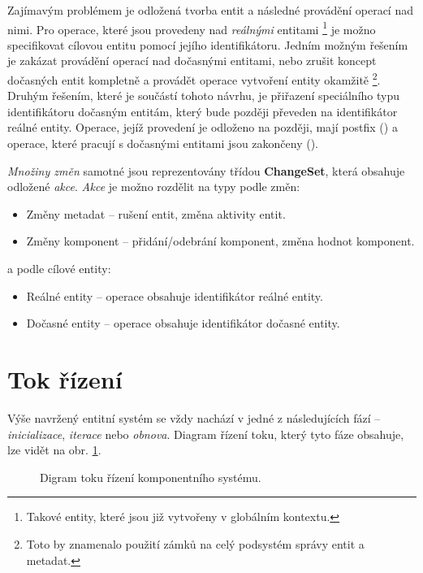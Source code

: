 Zajímavým problémem je odložená tvorba entit a následné provádění operací nad nimi. Pro operace, které jsou provedeny nad \emph{reálnými} entitami \footnote{Takové entity, které jsou již vytvořeny v globálním kontextu.} je možno specifikovat cílovou entitu pomocí jejího identifikátoru. Jedním možným řešením je zakázat provádění operací nad dočasnými entitami, nebo zrušit koncept dočasných entit kompletně a provádět operace vytvoření entity okamžitě \footnote{Toto by znamenalo použití zámků na celý podsystém správy entit a metadat.}. Druhým řešením, které je součástí tohoto návrhu, je přiřazení speciálního typu identifikátoru dočasným entitám, který bude později převeden na identifikátor reálné entity. Operace, jejíž provedení je odloženo na později, mají postfix  () a operace, které pracují s dočasnými entitami jsou zakončeny  ().

\emph{Množiny změn} samotné jsou reprezentovány třídou \textbf{ChangeSet}, která obsahuje odložené \emph{akce}. \emph{Akce} je možno rozdělit na typy podle změn:
\begin{itemize}
	\item Změny metadat -- rušení entit, změna aktivity entit.
	\item Změny komponent -- přidání/odebrání komponent, změna hodnot komponent.
\end{itemize}
\noindent a podle cílové entity: 
\begin{itemize}
	\item Reálné entity -- operace obsahuje identifikátor reálné entity.
	\item Dočasné entity -- operace obsahuje identifikátor dočasné entity.
\end{itemize}

\section{Tok řízení}

Výše navržený entitní systém se vždy nachází v jedné z následujících fází -- \emph{inicializace}, \emph{iterace} nebo \emph{obnova}. Diagram řízení toku, který tyto fáze obsahuje, lze vidět na obr. \ref{Fig:DESFlow}.

\begin{figure}[H]
	\begin{center}
	\end{center}
	\caption{Digram toku řízení komponentního systému.}
	\label{Fig:DESFlow}
\end{figure}

